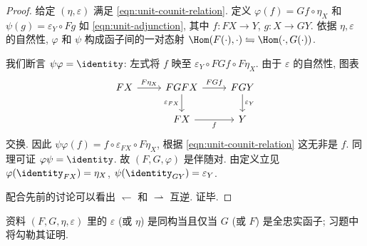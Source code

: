 \begin{proof}
	给定 $(\eta, \varepsilon)$ 满足 \eqref{eqn:unit-counit-relation}. 定义 $\varphi(f) = Gf \circ \eta_X$ 和 $\psi(g) = \varepsilon_Y \circ Fg$ 如 \eqref{eqn:unit-adjunction}, 其中 $f: FX \to Y$, $g: X \to GY$. 依据 $\eta, \varepsilon$ 的自然性, $\varphi$ 和 $\psi$ 构成函子间的一对态射 $\Hom(F(\cdot), \cdot) \leftrightharpoons \Hom(\cdot, G(\cdot))$.

	我们断言 $\psi \varphi = \identity$: 左式将 $f$ 映至 $\varepsilon_Y \circ FGf \circ F\eta_X$. 由于 $\varepsilon$ 的自然性, 图表
	\[\begin{tikzcd}
		FX \arrow[r, "{F\eta_X}"] & FGFX \arrow[r, "{FGf}"] \arrow[d, "{\varepsilon_{FX}}"'] & FGY \arrow[d, "{\varepsilon_Y}"] \\
		& FX \arrow[r, "f"'] & Y
	\end{tikzcd} \]
	交换. 因此 $\psi \varphi(f) = f \circ \varepsilon_{FX} \circ F\eta_X$, 根据 \eqref{eqn:unit-counit-relation} 这无非是 $f$. 同理可证 $\varphi \psi =\identity$. 故 $(F, G, \varphi)$ 是伴随对. 由定义立见 $\varphi(\identity_{FX})=\eta_X$, $\psi(\identity_{GY}) = \varepsilon_Y$.

	配合先前的讨论可以看出 $\leftharpoondown$ 和 $\rightharpoonup$ 互逆. 证毕.
\end{proof}
资料 $(F, G, \eta, \varepsilon)$ 里的 $\varepsilon$ (或 $\eta$) 是同构当且仅当 $G$ (或 $F$) 是全忠实函子; 习题中将勾勒其证明.

